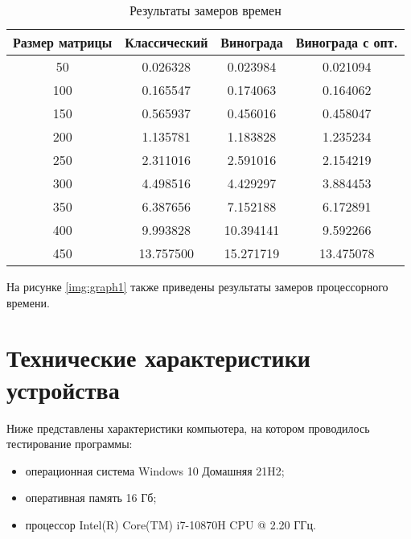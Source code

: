 \begin{table}[h]
    \begin{center}
        \begin{threeparttable}
        \captionsetup{justification=raggedright,singlelinecheck=off}
        \caption{\label{tbl:time_res}Результаты замеров времен}
        \begin{tabular}{|c|c|c|c|}
            \hline
            Размер матрицы & Классический & Винограда & Винограда с опт. \\
            \hline
            50 & 0.026328 & 0.023984 & 0.021094 \\ 
            \hline
            100 & 0.165547 & 0.174063 & 0.164062 \\ 
            \hline
            150 & 0.565937 & 0.456016 & 0.458047 \\ 
            \hline
            200 & 1.135781 & 1.183828 & 1.235234 \\ 
            \hline
            250 & 2.311016 & 2.591016 & 2.154219 \\ 
            \hline
            300 & 4.498516 & 4.429297 & 3.884453 \\ 
            \hline
            350 & 6.387656 & 7.152188 & 6.172891 \\ 
            \hline
            400 & 9.993828 & 10.394141 & 9.592266 \\ 
            \hline
            450 & 13.757500 & 15.271719 & 13.475078 \\ 
            \hline
		\end{tabular}
    \end{threeparttable}
\end{center}
\end{table}

\FloatBarrier

На рисунке \ref{img:graph1} также приведены результаты замеров процессорного времени.

\FloatBarrier


\section{Технические характеристики устройства}

Ниже представлены характеристики компьютера, на котором проводилось тестирование программы:
\begin{itemize}
    \item операционная система Windows 10 Домашняя 21H2;
    \item оперативная память 16 Гб;
    \item процессор Intel(R) Core(TM) i7-10870H CPU @ 2.20 ГГц.
\end{itemize}

